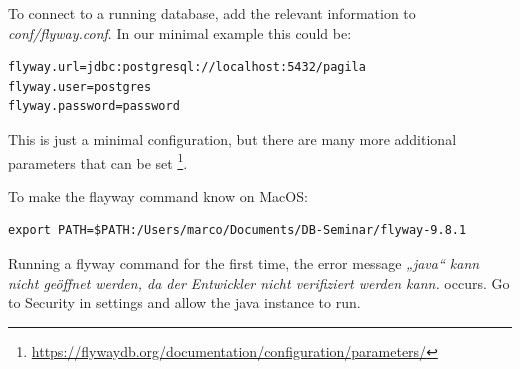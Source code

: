 %
To connect to a running database, add the relevant information to \textit{conf/flyway.conf}.
In our minimal example this could be:

\begin{lstlisting}[caption=Minimal configuration]
flyway.url=jdbc:postgresql://localhost:5432/pagila
flyway.user=postgres
flyway.password=password
\end{lstlisting}

This is just a minimal configuration, but there are many more additional parameters that can be set \footnote{\url{https://flywaydb.org/documentation/configuration/parameters/}}.


%
To make the flayway command know on MacOS:
\begin{lstlisting}[caption=Minimal configuration]
export PATH=$PATH:/Users/marco/Documents/DB-Seminar/flyway-9.8.1
\end{lstlisting}
Running a flyway command for the first time, the error message \textit{„java“ kann nicht geöffnet werden, da der Entwickler nicht verifiziert werden kann.} occurs. Go to Security in settings and allow the java instance to run.

\newpage